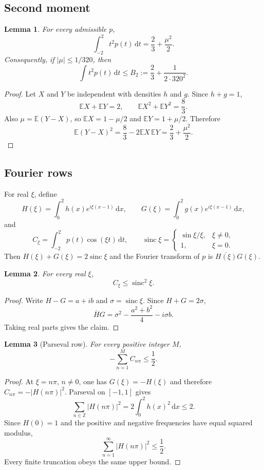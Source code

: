 \documentclass[11pt]{article}
\newtheorem{lemma}{Lemma}
\newcommand{\dd}{\,\mathrm{d}}
\DeclareMathOperator{\sinc}{sinc}
\begin{document}
\subsection{Second moment}

\begin{lemma}\label{lem:second}
For every admissible $p$,
\[
  \int_{-2}^{2}t^2p(t)\dd t=\frac23+\frac{\mu^2}{2}.
\]
Consequently, if $|\mu|\le1/320$, then
\[
  \int t^2p(t)\dd t\le
  B_2:=\frac23+\frac{1}{2\cdot320^2}.
\]
\end{lemma}

\begin{proof}
Let $X$ and $Y$ be independent with densities $h$ and $g$. Since $h+g=1$,
\[
  \mathbb EX+\mathbb EY=2,\qquad
  \mathbb EX^2+\mathbb EY^2=\frac83.
\]
Also $\mu=\mathbb E(Y-X)$, so
$\mathbb EX=1-\mu/2$ and $\mathbb EY=1+\mu/2$. Therefore
\[
  \mathbb E(Y-X)^2
  =\frac83-2\mathbb EX\,\mathbb EY
  =\frac23+\frac{\mu^2}{2}.
\]
\end{proof}

\subsection{Fourier rows}

For real $\xi$, define
\[
  H(\xi)=\int_0^2h(x)e^{i\xi(x-1)}\dd x,\qquad
  G(\xi)=\int_0^2g(x)e^{i\xi(x-1)}\dd x,
\]
and
\[
  C_\xi=\int_{-2}^{2}p(t)\cos(\xi t)\dd t,\qquad
  \sinc\xi=\begin{cases}\sin\xi/\xi,&\xi\ne0,\\1,&\xi=0.\end{cases}
\]
Then $H(\xi)+G(\xi)=2\sinc\xi$ and the Fourier transform of $p$ is
$\overline{H(\xi)}G(\xi)$.

\begin{lemma}\label{lem:cosine}
For every real $\xi$,
\[
  C_\xi\le\sinc^2\xi.
\]
\end{lemma}

\begin{proof}
Write $H-G=a+ib$ and $\sigma=\sinc\xi$. Since $H+G=2\sigma$,
\[
  \overline HG
  =\sigma^2-\frac{a^2+b^2}{4}-i\sigma b.
\]
Taking real parts gives the claim.
\end{proof}

\begin{lemma}[Parseval row]\label{lem:parseval}
For every positive integer $M$,
\[
  -\sum_{n=1}^{M}C_{n\pi}\le\frac12.
\]
\end{lemma}

\begin{proof}
At $\xi=n\pi$, $n\ne0$, one has $G(\xi)=-H(\xi)$ and therefore
$C_{n\pi}=-|H(n\pi)|^2$. Parseval on $[-1,1]$ gives
\[
  \sum_{n\in\mathbb Z}|H(n\pi)|^2
  =2\int_0^2h(x)^2\dd x\le2.
\]
Since $H(0)=1$ and the positive and negative frequencies have equal squared
modulus,
\[
  \sum_{n=1}^{\infty}|H(n\pi)|^2\le\frac12.
\]
Every finite truncation obeys the same upper bound.
\end{proof}
\end{document}
